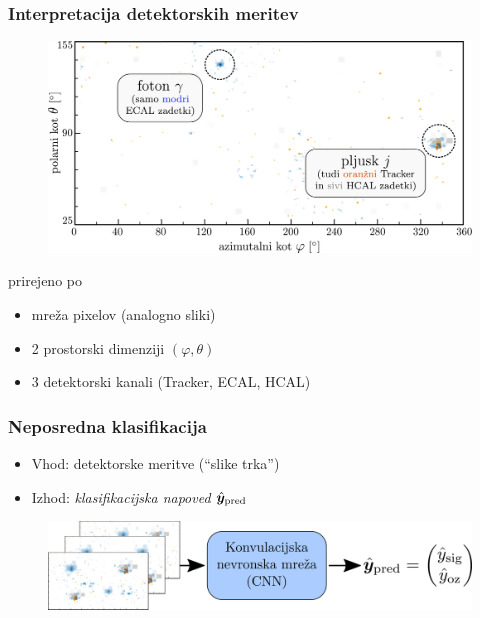 \documentclass[14pt, t]{beamer}
\renewcommand{\vec}[1]{\bm{#1}}
\newcommand{\y}{\vec{y}}
\begin{document}
\begin{frame}
    \frametitle{Interpretacija detektorskih meritev}

    \begin{figure}[htb!]
        \centering
        \includegraphics[width=\linewidth]{raster/raster-svg-slo/event-image.pdf}
    \end{figure}
    \vspace{-9mm}
    \hfill
    {\tiny prirejeno po \cite{andrews-higgs}}

    \vspace{-1mm}
    \begin{itemize}
    
        \item mreža pixelov (analogno sliki)
        \item 2 prostorski dimenziji $ (\varphi, \theta) $
        \item 3 detektorski kanali (Tracker, ECAL, HCAL)
    
    \end{itemize}

\end{frame}

\begin{frame}
    \frametitle{Neposredna klasifikacija}

    \begin{itemize}
    
        \item Vhod: detektorske meritve (``slike trka'')

        \item Izhod: \textit{klasifikacijska napoved $ \hat{\y}_{\textup{pred}} $}
    
    \end{itemize}
    \begin{figure}[htb!]
        \centering
        \includegraphics[width=\linewidth]{raster/raster-svg-slo/cnn-in-out.png}
    \end{figure}
    
\end{frame}
\end{document}
